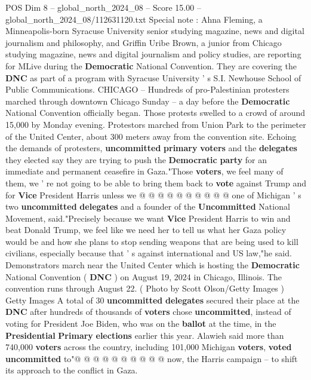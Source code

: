 \begin{textsample}{POS Dim 8 – global\_north\_2024\_08 – Score 15.00 – global\_north\_2024\_08/112631120.txt}  \label{ex:f8_pos_037}
Special note : Ahna Fleming, a Minneapolis-born Syracuse University senior studying magazine, news and digital journalism and philosophy, and Griffin Uribe Brown, a junior from Chicago studying magazine, news and digital journalism and policy studies, are reporting for MLive during the \textbf{Democratic} National Convention.
They are covering the \textbf{DNC} as part of a program with Syracuse University ' s S.I.
Newhouse School of Public Communications.
CHICAGO -- Hundreds of pro-Palestinian protesters marched through downtown Chicago Sunday -- a day before the \textbf{Democratic} National Convention officially began.
Those protests swelled to a crowd of around 15,000 by Monday evening.
Protestors marched from Union Park to the perimeter of the United Center, about 300 meters away from the convention site.
Echoing the demands of protesters, \textbf{uncommitted} \textbf{primary} \textbf{voters} and the \textbf{delegates} they elected say they are trying to push the \textbf{Democratic} \textbf{party} for an immediate and permanent ceasefire in Gaza."Those \textbf{voters}, we feel many of them, we ' re not going to be able to bring them back to \textbf{vote} against Trump and for \textbf{Vice} President Harris unless we @ @ @ @ @ @ @ @ @ @ one of Michigan ' s two \textbf{uncommitted} \textbf{delegates} and a founder of the \textbf{Uncommitted} National Movement, said."Precisely because we want \textbf{Vice} President Harris to win and beat Donald Trump, we feel like we need her to tell us what her Gaza policy would be and how she plans to stop sending weapons that are being used to kill civilians, especially because that ' s against international and US law,"he said.
Demonstrators march near the United Center which is hosting the \textbf{Democratic} National Convention ( \textbf{DNC} ) on August 19, 2024 in Chicago, Illinois.
The convention runs through August 22. ( Photo by Scott Olson/Getty Images ) Getty Images A total of 30 \textbf{uncommitted} \textbf{delegates} secured their place at the \textbf{DNC} after hundreds of thousands of \textbf{voters} chose \textbf{uncommitted}, instead of voting for President Joe Biden, who was on the \textbf{ballot} at the time, in the \textbf{Presidential} \textbf{Primary} \textbf{elections} earlier this year.
Alawieh said more than 740,000 \textbf{voters} across the country, including 101,000 Michigan \textbf{voters}, \textbf{voted} \textbf{uncommitted} to"@ @ @ @ @ @ @ @ @ @ now, the Harris campaign -- to shift its approach to the conflict in Gaza.

\end{textsample}

